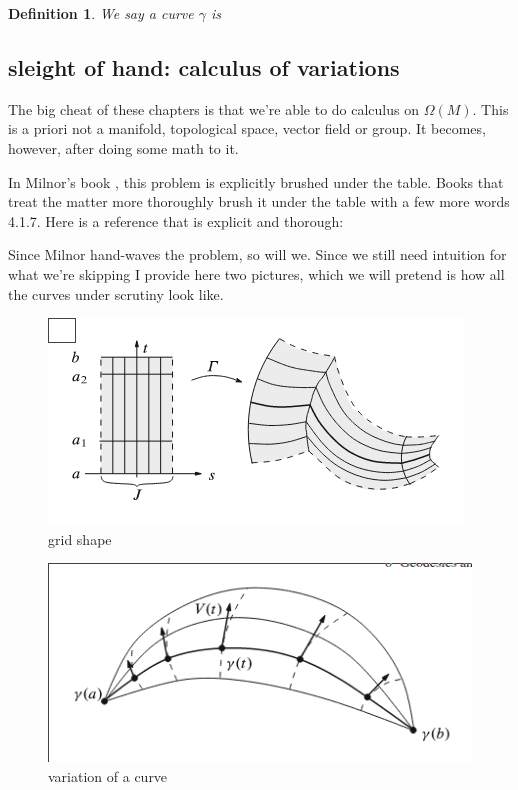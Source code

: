 \documentclass{article}
\newtheorem{def}{Definition}
\newcommand{\OM}{\Omega(M)}
\begin{document}
\begin{def}
    \label{def:reparametrization}
    We say a curve $\gamma$ is
\end{def}

\subsection{sleight of hand: calculus of variations}

The big cheat of these chapters is that we're able to do calculus on $\OM$.
This is a priori not a manifold, topological space, vector field or group.
It becomes, however, after doing some math to it.

In Milnor's book \cite{milnor}, this problem is explicitly brushed under the table.
Books that treat the matter more thoroughly brush it under the table with a few more words
\cite{salamon} 4.1.7.
Here is a reference that is explicit and thorough: \cite{lee}

Since Milnor hand-waves the problem, so will we. Since we still need intuition for what we're
skipping I provide here two pictures, which we will pretend is how all the curves under scrutiny
look like.

\begin{figure}
    \includegraphics{img/grid.png}
    \caption{grid shape}
    \label{fig:grid}
\end{figure}
\begin{figure}
    \includegraphics{img/sail.png}
    \caption{variation of a curve}
    \label{fig:sail}
\end{figure}
\end{document}
